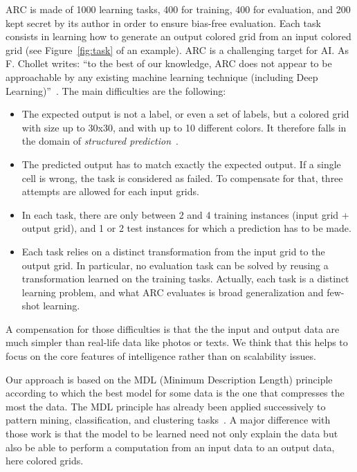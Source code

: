\documentclass[a4paper]{llncs}
\begin{document}
ARC is made of 1000 learning tasks, 400 for training, 400 for
evaluation, and 200 kept secret by its author in order to ensure
bias-free evaluation. Each task consists in learning how to generate
an output colored grid from an input colored grid (see
Figure~\ref{fig:task} of an example).
%
ARC is a challenging target for AI. As F. Chollet writes: ``to the
best of our knowledge, ARC does not appear to be approachable by any
existing machine learning technique (including Deep
Learning)''~\cite{Chollet2019}. The main difficulties are the
following:
\begin{itemize}
\item The expected output is not a label, or even a set of labels, but
  a colored grid with size up to 30x30, and with up to 10 different
  colors. It therefore falls in the domain of {\em structured
    prediction}~\cite{dietterich2008structured}.
\item The predicted output has to match exactly the expected
  output. If a single cell is wrong, the task is considered as
  failed. To compensate for that, three attempts are allowed for each
  input grids.
\item In each task, there are only between 2 and 4 training instances
  (input grid + output grid), and 1 or 2 test instances for which a
  prediction has to be made.
\item Each task relies on a distinct transformation from the input
  grid to the output grid. In particular, no evaluation task can be
  solved by reusing a transformation learned on the training
  tasks. Actually, each task is a distinct learning problem, and what
  ARC evaluates is broad generalization and few-shot learning.
\end{itemize}
A compensation for those difficulties is that the the input and output
data are much simpler than real-life data like photos or texts. We
think that this helps to focus on the core features of intelligence
rather than on scalability issues.

Our approach is based on the MDL (Minimum Description Length)
principle~\cite{Rissanen1978,Grunwald2019} according to which the best
model for some data is the one that compresses the most the data.
%
The MDL principle has already been applied successively to pattern
mining, classification, and clustering tasks~\cite{KRIMP2011}.
%
A major difference with those work is that the model to be learned
need not only explain the data but also be able to perform a
computation from an input data to an output data, here colored grids.
\end{document}

